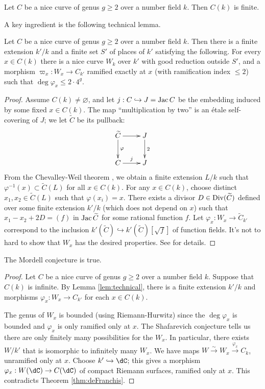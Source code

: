 \begin{conjecture}[Mordell]
Let $C$ be a nice curve of genus $g\geqslant 2$ over a number field $k$. Then 
$C(k)$ is finite. 
\end{conjecture}

A key ingredient is the following technical lemma. 

\begin{lemma}\label{lem:technical}
Let $C$ be a nice curve of genus $g\geqslant 2$ over a number field $k$. Then 
there is a finite extension $k'/k$ and a finite set $S'$ of places of $k'$ 
satisfying the following. For every $x\in C(k)$ there is a nice curve $W_k$ 
over $k'$ with good reduction outside $S'$, and a morphism 
$\varpi_x:W_x \to C_{k'}$ ramified exactly at $x$ (with ramification index 
$\leqslant 2$) such that $\deg\varphi_x \leqslant 2\cdot 4^g$. 
\end{lemma}
\begin{proof}
Assume $C(k)\ne\varnothing$, and let $j:C\hookrightarrow J=\operatorname{Jac} C$ be the 
embedding induced by some fixed $x\in C(k)$. The map ``multiplication by two'' 
is an \'etale self-covering of $J$; we let $\widetilde C$ be its pullback: 
\[\xymatrix{
  \widetilde C \ar[r] \ar[d]^-\varphi 
    & J \ar[d]^-2 \\
  C \ar[r]^-j 
    & J 
}\]
From the Chevalley-Weil theorem \cite[10.3.11]{bg06}, we obtain a finite 
extension $L/k$ such that $\varphi^{-1}(x)\subset \widetilde C(L)$ for all 
$x\in C(k)$. For any $x\in C(k)$, choose distinct $x_1,x_2\in \widetilde C(L)$ 
such that $\varphi(x_i) = x$. There exists a divisor 
$D\in \operatorname{Div}(\widetilde C)$ defined over some finite extension $k'/k$ (which 
does not depend on $x$) such that $x_1-x_2 + 2 D=(f)$ in $\operatorname{Jac}{\widetilde C}$ 
for some rational function $f$. Let 
$\varphi_x:W_x \to \widetilde C_{k'}$ correspond to the inclusion 
$k'(\widetilde C)\hookrightarrow k'(\widetilde C)[\sqrt f]$ of function 
fields. It's not to hard to show that $W_x$ has the desired properties. See 
\cite[IV.2.1]{la91} for details. 
\end{proof}

\begin{theorem}
The Mordell conjecture is true. 
\end{theorem}
\begin{proof}
Let $C$ be a nice curve of genus $g\geqslant 2$ over a number field $k$. 
Suppose that $C(k)$ is infinite. By Lemma \ref{lem:technical}, there is a 
finite extension $k'/k$ and morphisms $\varphi_x:W_x \to C_{k'}$ for each 
$x\in C(k)$. 

The genus of $W_x$ is bounded (using Riemann-Hurwitz) since the 
$\deg\varphi_x$ is bounded and $\varphi_x$ is only ramified only at $x$. 
The Shafarevich conjecture tells us there are only finitely many possibilities 
for the $W_x$. In particular, there exists $W/k'$ that is isomorphic to 
infinitely many $W_x$. We have maps 
$W\xrightarrow\sim W_x \xrightarrow{\varphi_x} C_k$, unramified only at $x$. 
Choose $k'\hookrightarrow\dC$; this gives a morphism 
$\varphi_x:W(\dC) \to C(\dC)$ of compact Riemann surfaces, ramified only at 
$x$. This contradicts Theorem \ref{thm:deFranchis}.
\end{proof}

